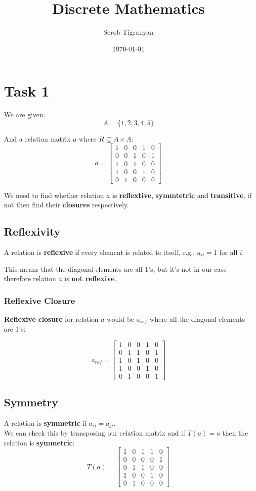 \documentclass[11pt]{article}
\author{Serob Tigranyan}
\date{\today}
\title{Discrete Mathematics}
\begin{document}
\maketitle
\tableofcontents

\newpage
\section{Task 1}
\label{sec:org6303759}
We are given:
\[
A = \{ 1, 2, 3, 4, 5 \}
\]

And a relation matrix \(a\) where \(R \subseteq A \times A\):
\[
a =
 \begin{bmatrix}
 1 & 0 & 0 & 1 & 0 \\
 0 & 0 & 1 & 0 & 1 \\
 1 & 0 & 1 & 0 & 0 \\
 1 & 0 & 0 & 1 & 0 \\
 0 & 1 & 0 & 0 & 0
 \end{bmatrix}
\]

We need to find whether relation \(a\) is \textbf{reflextive}, \textbf{symmtetric} and \textbf{transitive}, if not then find their \textbf{closures} respectively.
\subsection{Reflexivity}
\label{sec:orgc1d25eb}
A relation is \textbf{reflexive} if every element is related to itself, e.g., \(a_{ii} = 1\) for all \(i\).

This means that the diagonal elements are all 1's, but it's not in our case therefore relation \(a\) is \textbf{not reflexive}.
\subsubsection{Reflexive Closure}
\label{sec:org16c50b3}
\textbf{Reflexive closure} for relation \(a\) would be \(a_{ref}\) where all the diagonal elements are 1's:

\[
a_{ref} =
 \begin{bmatrix}
 1 & 0 & 0 & 1 & 0 \\
 0 & 1 & 1 & 0 & 1 \\
 1 & 0 & 1 & 0 & 0 \\
 1 & 0 & 0 & 1 & 0 \\
 0 & 1 & 0 & 0 & 1
 \end{bmatrix}
\]
\subsection{Symmetry}
\label{sec:orgfdb7504}
A relation is \textbf{symmetric} if \(a_{ij} = a_{ji}\). \\
We can check this by transposing our relation matrix and if \(T(a) = a\) then the relation is \textbf{symmetric}:
\[
T(a) =
 \begin{bmatrix}
 1 & 0 & 1 & 1 & 0 \\
 0 & 0 & 0 & 0 & 1 \\
 0 & 1 & 1 & 0 & 0 \\
 1 & 0 & 0 & 1 & 0 \\
 0 & 1 & 0 & 0 & 0
 \end{bmatrix}
\]
\end{document}
